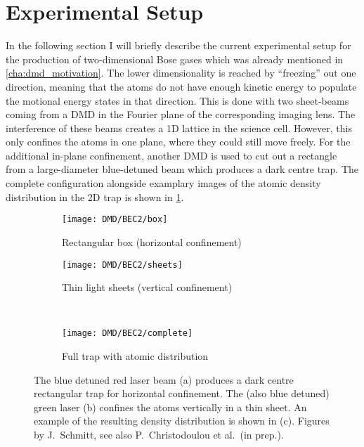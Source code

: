 \section{Experimental Setup}
\label{sec:dmd_experimental_setup}
In the following section I will briefly describe the current experimental setup for the production of two-dimensional Bose gases which was already mentioned in \cref{cha:dmd_motivation}. The lower dimensionality is reached by \enquote{freezing} out one direction, meaning that the atoms do not have enough kinetic energy to populate the motional energy states in that direction. This is done with two sheet-beams coming from a DMD in the Fourier plane of the corresponding imaging lens. The interference of these beams creates a 1D lattice in the science cell. However, this only confines the atoms in one plane, where they could still move freely. For the additional in-plane confinement, another DMD is used to cut out a rectangle from a large-diameter blue-detuned beam which produces a dark centre trap. The complete configuration alongside examplary images of the atomic density distribution in the 2D trap is shown in \cref{fig:bec2_trap_setup}.
\begin{figure}[htbp]
    \centering
    \begin{subfigure}[t]{0.48\textwidth}
        \centering
        \texttt{[image: DMD/BEC2/box]}
        \caption{Rectangular box (horizontal confinement)}
    \end{subfigure}
    \begin{subfigure}[t]{0.48\textwidth}
        \centering
        \texttt{[image: DMD/BEC2/sheets]}
        \caption{Thin light sheets (vertical confinement)}
    \end{subfigure}
    \\ \vspace{1ex}
    \begin{subfigure}[t]{0.7\textwidth}
        \centering
        \texttt{[image: DMD/BEC2/complete]}
        \caption{Full trap with atomic distribution}
    \end{subfigure}
    \caption[Optical box potential for two-dimensional Bose fluids]{The blue detuned red laser beam (a) produces a dark centre rectangular trap for horizontal confinement. The (also blue detuned) green laser (b) confines the atoms vertically in a thin sheet. An example of the resulting density distribution is shown in (c). Figures by J.~Schmitt, see also P.~Christodoulou et al.\ (in prep.).}
    \label{fig:bec2_trap_setup}
\end{figure}

